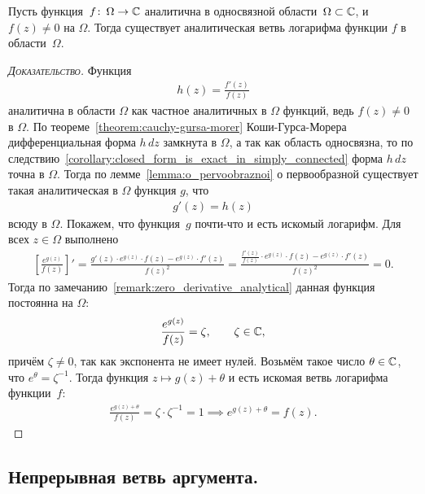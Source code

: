 \documentclass[../complex-analysis.tex]{subfiles}
\begin{document}
\begin{thm}
 \label{theorem:exist_log_f}
 Пусть функция~$ f\colon\,\Omega\to\mathbb{C} $ аналитична в односвязной области~$ \Omega \subset \mathbb{C} $, и $ f(z) \neq 0 $ на $ \Omega $. Тогда существует аналитическая ветвь логарифма функции $ f $ в области~$ \Omega $.
\end{thm}
\begin{proof}[\normalfont\textsc{Доказательство}]
 Функция
 \begin{align*}
  h(z) = \frac{f'(z)}{f(z)}
 \end{align*} аналитична в области $ \Omega $ как частное аналитичных в $ \Omega $ функций, ведь $ f(z) \neq 0 $ в $ \Omega $. По теореме~\ref{theorem:cauchy-gursa-morer} Коши-Гурса-Морера дифференциальная форма $ h\,dz $ замкнута в $ \Omega $, а так как область односвязна, то по следствию~\ref{corollary:closed_form_is_exact_in_simply_connected} форма $ h\,dz $ точна в $ \Omega $. Тогда по лемме~\ref{lemma:o_pervoobraznoi} о первообразной существует такая аналитическая в $ \Omega $ функция $ g $, что
 \begin{align*}
  g'(z) = h(z)
 \end{align*} всюду в $ \Omega $. Покажем, что функция~$ g $ почти-что и есть искомый логарифм. Для всех $ z \in \Omega $ выполнено
 \begin{align*}
  \left[ \frac{e^{g(z)}}{f(z)} \right]' = \frac{g'(z) \cdot e^{g(z)} \cdot f(z) - e^{g(z)} \cdot f'(z)}{f(z)^{2}} = \frac{\frac{f'(z)}{f(z)} \cdot e^{g(z)} \cdot f(z) - e^{g(z)} \cdot f'(z)}{f(z)^{2}} = 0.
 \end{align*} Тогда по замечанию~\ref{remark:zero_derivative_analytical} данная функция постоянна на $ \Omega $:
 \begin{align*}
  \frac{e^{g(z)}}{f(z)} = \zeta, \qquad \zeta\in\mathbb{C},
 \end{align*} причём $ \zeta\neq 0 $, так как экспонента не имеет нулей. Возьмём такое число $ \theta \in \mathbb{C} $, что $ e^{\theta} = \zeta^{-1} $. Тогда функция $ z \mapsto g(z) + \theta $ и есть искомая ветвь логарифма функции~$ f $:
 \begin{align*}
  \frac{e^{g(z) + \theta}}{f(z)} = \zeta \cdot \zeta^{-1} = 1 \implies e^{g(z)+\theta} = f(z).
 \end{align*}
\end{proof}

\subsection{Непрерывная ветвь аргумента.}
\end{document}
